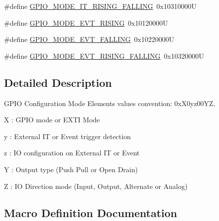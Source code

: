 \begin{DoxyCompactItemize}
\item 
\#define \hyperlink{group___g_p_i_o__mode__define_ga0678e61090ed61e91a6496f22ddfb3d1}{G\+P\+I\+O\+\_\+\+M\+O\+D\+E\+\_\+\+I\+T\+\_\+\+R\+I\+S\+I\+N\+G\+\_\+\+F\+A\+L\+L\+I\+NG}~0x10310000U
\item 
\#define \hyperlink{group___g_p_i_o__mode__define_ga97d78b82ea178ff7a4c35aa60b4e9338}{G\+P\+I\+O\+\_\+\+M\+O\+D\+E\+\_\+\+E\+V\+T\+\_\+\+R\+I\+S\+I\+NG}~0x10120000U
\item 
\#define \hyperlink{group___g_p_i_o__mode__define_gadbfa532b3566783ac6c0e07c2e0ffe5e}{G\+P\+I\+O\+\_\+\+M\+O\+D\+E\+\_\+\+E\+V\+T\+\_\+\+F\+A\+L\+L\+I\+NG}~0x10220000U
\item 
\#define \hyperlink{group___g_p_i_o__mode__define_ga1b760771297ed2fc55a6b13071188491}{G\+P\+I\+O\+\_\+\+M\+O\+D\+E\+\_\+\+E\+V\+T\+\_\+\+R\+I\+S\+I\+N\+G\+\_\+\+F\+A\+L\+L\+I\+NG}~0x10320000U
\end{DoxyCompactItemize}


\subsection{Detailed Description}
G\+P\+IO Configuration Mode Elements values convention\+: 0x\+X0yz00\+YZ. 


\begin{DoxyItemize}
\item X \+: G\+P\+IO mode or E\+X\+TI Mode
\item y \+: External IT or Event trigger detection
\item z \+: IO configuration on External IT or Event
\item Y \+: Output type (Push Pull or Open Drain)
\item Z \+: IO Direction mode (Input, Output, Alternate or Analog) 
\end{DoxyItemize}

\subsection{Macro Definition Documentation}
\mbox{\label{group___g_p_i_o__mode__define_gadb81109590b66d8e48076820064921b1}} 

